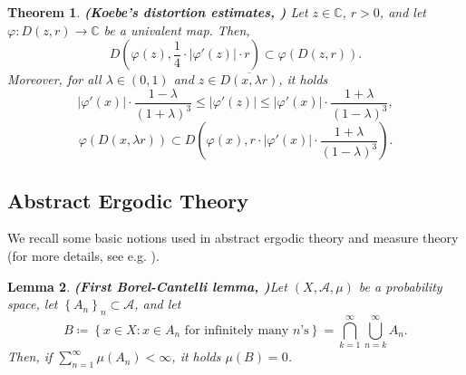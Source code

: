 \documentclass[11pt]{article}
\newtheorem{thm}{Theorem}[section]
\newtheorem{lemma}[thm]{Lemma}
\theoremstyle{definition}
\theoremstyle{remark}
\theoremstyle{plain}
\begin{document}
\begin{thm}{\bf (Koebe's distortion estimates, {\normalfont \cite[Sect. 23.1]{UrbanskiRoyMunday3}})} \label{thm-Koebe} Let $ z\in\mathbb{C} $, $ r>0 $, and let $ \varphi\colon D(z,r)\to\mathbb{C} $ be a univalent map. Then, 
	\[ D\left( \varphi(z), \frac{1}{4}\cdot \left| \varphi'(z)\right| \cdot r\right)  \subset\varphi(D(z,r)).\]
Moreover, for all $ \lambda\in (0,1) $ and $ z\in \overline{D(x,\lambda r)} $, it holds
	\[\left| \varphi'(x)\right| \cdot \dfrac{1-\lambda}{(1+\lambda)^3}\leq\left| \varphi'(z)\right| \leq  { \left| \varphi'(x)\right| }\cdot \dfrac{1+\lambda }{(1-\lambda )^3},\]
\[  \varphi(D(x,\lambda r))\subset D\left( \varphi(x), r\cdot { \left| \varphi'(x)\right| }\cdot \dfrac{1+\lambda }{(1-\lambda )^3}\right) .\]
\end{thm}










\subsection{Abstract Ergodic Theory}
We recall some basic notions used in abstract ergodic theory and measure theory (for more details, see e.g. \cite{PrzytyckiUrbanski, Hawkins, UrbanskiRoyMunday1}).

\begin{lemma}{\bf (First Borel-Cantelli lemma, {\normalfont \cite[1.12.89]{Bogachev}})}\label{lemma-borel-cantelli}
	Let $ (X,\mathcal{A}, \mu) $ be a probability space, let $ \left\lbrace A_n\right\rbrace _n\subset \mathcal{A} $, and let \[B\coloneqq \left\lbrace x\in X\colon x\in A_n\textrm{ for infinitely many }n\textrm{'s}\right\rbrace =\bigcap\limits_{k=1}^\infty\bigcup_{n=k}^\infty A_n .\] Then, if $ \sum_{n=1}^{\infty}\mu (A_n)<\infty $, it holds $ \mu (B)=0 $.
\end{lemma}
\end{document}
